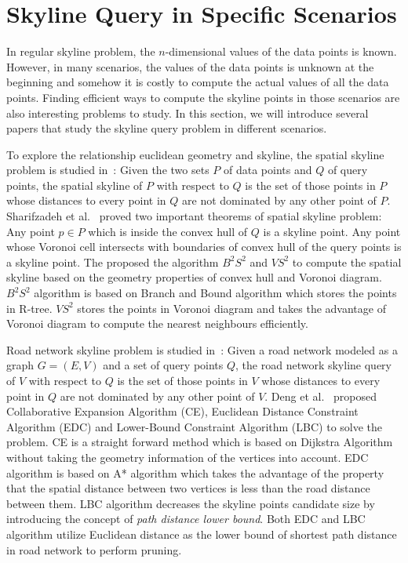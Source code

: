 \section{Skyline Query in Specific Scenarios}
\label{sec:rel:constrain}
In regular skyline problem, the $n$-dimensional values of the data points is known. However, in many scenarios, the values of the data points is unknown at the beginning and somehow it is costly to compute the actual values of all the data points. Finding efficient ways to compute the skyline points in those scenarios are also interesting problems to study. In this section, we will introduce several papers that study the skyline query problem in different scenarios.

To explore the relationship euclidean geometry and skyline, the spatial skyline problem is studied in~\cite{sharifzadeh2006spatial}: Given the two sets $P$ of data points and $Q$ of query points, the spatial skyline of $P$ with respect to $Q$ is the set of those points in $P$ whose distances to every point in $Q$ are not dominated by any other point of $P$. Sharifzadeh et al.~\cite{sharifzadeh2006spatial} proved two important theorems of spatial skyline problem: Any point $p \in P$ which is inside the convex hull of $Q$ is a skyline point. Any point whose Voronoi cell intersects with boundaries of convex hull of the query points is a skyline point. The proposed the algorithm $B^2S^2$ and $VS^2$ to compute the spatial skyline based on the geometry properties of convex hull and Voronoi diagram. $B^2S^2$ algorithm is based on Branch and Bound algorithm which stores the points in R-tree. $VS^2$ stores the points in Voronoi diagram and takes the advantage of Voronoi diagram to compute the nearest neighbours efficiently.

Road network skyline problem is studied in~\cite{deng2007multi}: Given a road network modeled as a graph $G=(E, V)$ and a set of query points $Q$, the road network skyline query of $V$ with respect to $Q$ is the set of those points in $V$ whose distances to every point in $Q$ are not dominated by any other point of $V$. Deng et al.~\cite{deng2007multi} proposed Collaborative Expansion Algorithm (CE), Euclidean Distance Constraint Algorithm (EDC) and Lower-Bound Constraint Algorithm (LBC) to solve the problem. CE is a straight forward method which is based on Dijkstra Algorithm without taking the geometry information of the vertices into account. EDC algorithm is based on A* algorithm which takes the advantage of the property that the spatial distance between two vertices is less than the road distance between them. LBC algorithm decreases the skyline points candidate size by introducing the concept of \emph{path distance lower bound}. Both EDC and LBC algorithm utilize Euclidean distance as the lower bound of shortest path distance in road network to perform pruning. 

